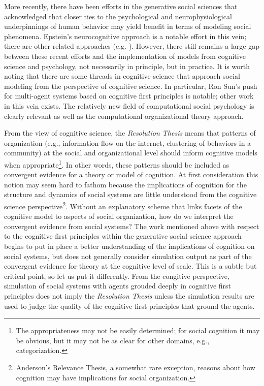 \documentclass{article}
\begin{document}
More recently, there have been efforts in the generative social sciences that acknowledged that closer ties to the psychological and neurophysiological underpinnings of human behavior may yield benefit in terms of modeling social phenomena.  Epstein's neurocognitive approach is a notable effort in this vein\cite{epstein2014}; there are other related approaches (e.g. \cite{caillou2017,sakellariou2008,malleson2012}).  However, there still remains a large gap between these recent efforts and the implementation of models from cognitive science and psychology, not necessarily in principle, but in practice. It is worth noting that there are some threads in cognitive science that approach social modeling from the perspective of cognitive science.  In particular, Ron Sun's push for multi-agent systems based on cognitive first principles is notable\cite{sun2006}; other work in this vein exists\cite{Bhattacharyya2010,lebiere2000,reitter2012,romero2014,gonzalez2003,fu2007,huberman1998,west2001,west2005}.  The relatively new field of computational social psychology is clearly relevant\cite{vallacher2017} as well as the computational organizational theory approach\cite{prietula1998}.

From the view of cognitive science, the \textit{Resolution Thesis} means that patterns of organization (e.g., information flow on the internet, clustering of behaviors in a community) at the social and organizational level should inform cognitive models when appropriate\footnote{The appropriateness may not be easily determined; for social cognition it may be obvious, but it may not be as clear for other domains, e.g., categorization.}.  In other words, these patterns should be included as convergent evidence for a theory or model of cognition.  At first consideration this notion may seem hard to fathom because the implications of cognition for the structure and dynamics of social systems are little understood from the cognitive science perspective\footnote{Anderson's Relevance Thesis\cite{anderson2002}, a somewhat rare exception, reasons about how cognition may have implications for social organization.}.  Without an explanatory scheme that links facets of the cognitive model to aspects of social organization, how do we interpret the convergent evidence from social systems?  The work mentioned above with respect to the cognitive first principles within the generative social science approach \cite{sun2006,Bhattacharyya2010,lebiere2000,reitter2012,romero2014,gonzalez2003,fu2007,huberman1998,west2001,west2005} begins to put in  place a better understanding of the implications of cognition on social systems, but does not generally consider simulation output as part of the convergent evidence for theory at the cognitive level of scale.  This is a subtle but critical point, so let us put it differently.  From the congitive perspective, simulation of social systems with agents grouded deeply in cognitive first principles does not imply the \textit{Resolution Thesis} unless the simulation results are used to judge the quality of the cognitive first principles that ground the agents.  
\end{document}
